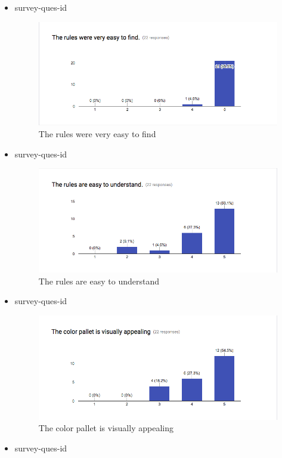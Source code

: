 \documentclass[12pt, titlepage]{article}
\newcounter{USnum}
\newcommand{\ttheUSnum}{survey-ques-id \theUSnum}
\begin{document}
\begin{itemize}

\item {\ttheUSnum \label{USq1}\\}
\begin{figure}[H]
\centering
\includegraphics[width=0.9\linewidth]{../../ReferenceMaterial/Survey_Results/Survey_Question_1}
\caption{The rules were very easy to find }
\label{fig1}
\end{figure}

\item {\ttheUSnum \label{USq2}\\}

\begin{figure}[H]
\centering
\includegraphics[width=0.9\linewidth]{../../ReferenceMaterial/Survey_Results/Survey_Question_2.png}
\caption{The rules are easy to understand }
\end{figure}

\item {\ttheUSnum \label{USq3}\\}

\begin{figure}[H]
\centering
\includegraphics[width=0.9\linewidth]{../../ReferenceMaterial/Survey_Results/Survey_Question_3.png}
\caption{The color pallet is visually appealing }
\end{figure}
\newpage
\item {\ttheUSnum \label{USq5}\\}


\end{itemize}
\end{document}
